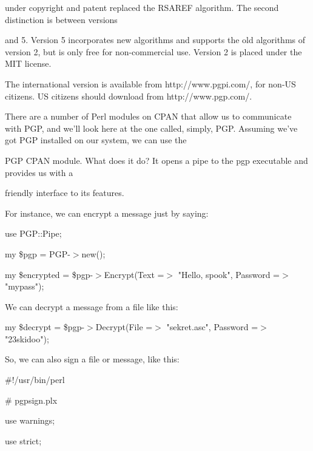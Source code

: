 \documentclass[a4paper,11pt]{book}
\begin{document}
\noindent under copyright and patent replaced the RSAREF algorithm. The second distinction is between versions

 and 5. Version 5 incorporates new algorithms and supports the old algorithms of version 2, but is only free for non-commercial use. Version 2 is placed under the MIT license.

\noindent 

\noindent The international version is available from http://www.pgpi.com/, for non-US citizens. US citizens should download from http://www.pgp.com/.

\noindent 

\noindent There are a number of Perl modules on CPAN that allow us to communicate with PGP, and we'll look here at the one called, simply, PGP. Assuming we've got PGP installed on our system, we can use the

\noindent PGP CPAN module. What does it do? It opens a pipe to the pgp executable and provides us with a

\noindent friendly interface to its features.

\noindent 

\noindent For instance, we can encrypt a message just by saying:

\noindent 

\noindent 

\noindent use PGP::Pipe;

\noindent my \$pgp = PGP-$>$new();

\noindent my \$encrypted = \$pgp-$>$Encrypt(Text =$>$ "Hello, spook", Password =$>$ "mypass");

\noindent 

\noindent We can decrypt a message from a file like this:

\noindent 

\noindent 

\noindent my \$decrypt = \$pgp-$>$Decrypt(File =$>$ "sekret.asc", Password =$>$ "23skidoo");

\noindent 

\noindent So, we can also sign a file or message, like this:

\noindent 

\noindent 

\noindent \#!/usr/bin/perl

\noindent \# pgpsign.plx

\noindent use warnings;

\noindent use strict;
\end{document}
